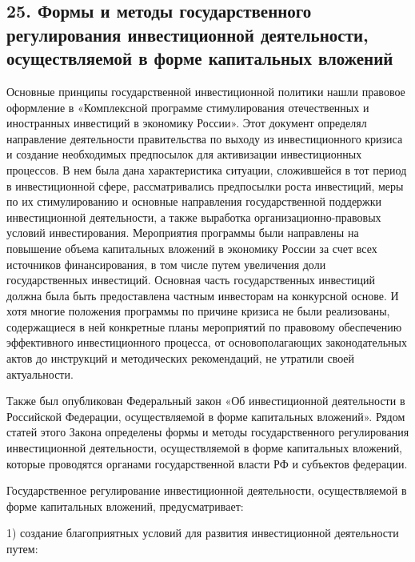 \subsection*{25. Формы и методы государственного регулирования инвестиционной деятельности, осуществляемой в форме капитальных вложений}

Основные принципы государственной инвестиционной политики нашли правовое оформление в «Комплексной программе стимулирования отечественных и иностранных инвестиций в экономику России». Этот документ определял направление деятельности правительства по выходу из инвестиционного кризиса и создание необходимых предпосылок для активизации инвестиционных процессов. В нем была дана характеристика ситуации, сложившейся в тот период в инвестиционной сфере, рассматривались предпосылки роста инвестиций, меры по их стимулированию и основные направления государственной поддержки инвестиционной деятельности, а также выработка организационно-правовых условий инвестирования.
Мероприятия программы были направлены на повышение объема капитальных вложений в экономику России за счет всех источников финансирования, в том числе путем увеличения доли государственных инвестиций. Основная часть государственных инвестиций должна была быть предоставлена частным инвесторам на конкурсной основе. И хотя многие положения программы по причине кризиса не были реализованы, содержащиеся в ней конкретные планы мероприятий по правовому обеспечению эффективного инвестиционного процесса, от основополагающих законодательных актов до инструкций и методических рекомендаций, не утратили своей актуальности.

Также был опубликован Федеральный закон «Об инвестиционной деятельности в Российской Федерации, осуществляемой в форме капитальных вложений». Рядом статей этого Закона определены формы и методы государственного регулирования инвестиционной деятельности, осуществляемой в форме капитальных вложений, которые проводятся органами государственной власти РФ и субъектов федерации.

Государственное регулирование инвестиционной деятельности, осуществляемой в форме капитальных вложений, предусматривает:

1) создание благоприятных условий для развития инвестиционной деятельности путем:

